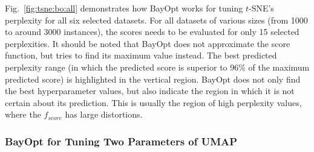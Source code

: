 Fig.~\ref{fig:tsne:bo:all} demonstrates how BayOpt works for tuning $t$-SNE's perplexity for all six selected datasets.
For all datasets of various sizes (from 1000 to around 3000 instances), the scores needs to be evaluated for only 15 selected perplexities.
It should be noted that BayOpt does not approximate the score function, but tries to find its maximum value instead.
The best predicted perplexity range (in which the predicted score is superior to 96\% of the maximum predicted score) is highlighted in the vertical region.
BayOpt does not only find the best hyperparameter values, but also indicate the region in which it is not certain about its prediction.
This is usually the region of high perplexity values, where the $f_{score}$ has large distortions.

\subsubsection{BayOpt for Tuning Two Parameters of UMAP}\label{sec:result:bo:umap}

